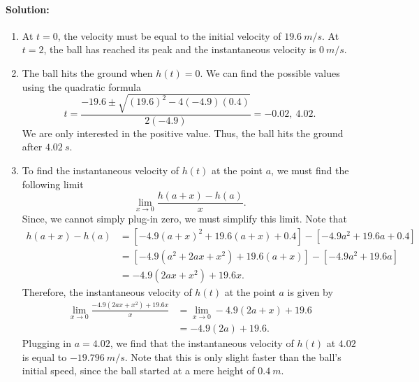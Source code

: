 \documentclass{article}
\begin{document}
\paragraph*{Solution:}
\begin{enumerate}[(i.)]
\item	At $t=0$, the velocity must be equal to the initial velocity of $19.6~m/s$. At $t=2$, the ball has reached its peak and the instantaneous velocity is $0~m/s$. 
\item	The ball hits the ground when $h(t)=0$. We can find the possible values using the quadratic formula
\[
t=\frac{-19.6\pm\sqrt{(19.6)^2-4(-4.9)(0.4)}}{2(-4.9)}=-0.02,~4.02.
\]
We are only interested in the positive value. Thus, the ball hits the ground after $4.02~s$. 
\item	To find the instantaneous velocity of $h(t)$ at the point $a$, we must find the following limit
\[
\lim_{x\rightarrow 0}\frac{h(a+x)-h(a)}{x}.
\]
Since, we cannot simply plug-in zero, we must simplify this limit. Note that
\begin{align*}
h(a+x)-h(a)&=[-4.9(a+x)^{2}+19.6(a+x)+0.4]-[-4.9a^{2}+19.6a+0.4] \\
&=[-4.9(a^{2}+2ax+x^{2})+19.6(a+x)]-[-4.9a^{2}+19.6a] \\
&=-4.9(2ax+x^{2})+19.6x.
\end{align*}
Therefore, the instantaneous velocity of $h(t)$ at the point $a$ is given by
\begin{align*}
\lim_{x\rightarrow 0}\frac{-4.9(2ax+x^{2})+19.6x}{x}&=\lim_{x\rightarrow 0}-4.9(2a+x)+19.6 \\
&=-4.9(2a)+19.6.
\end{align*}
Plugging in $a=4.02$, we find that the instantaneous velocity of $h(t)$ at $4.02$ is equal to $-19.796~m/s$. Note that this is only slight faster than the ball's initial speed, since the ball started at a mere height of $0.4~m$. 
\end{enumerate}
\end{document}
